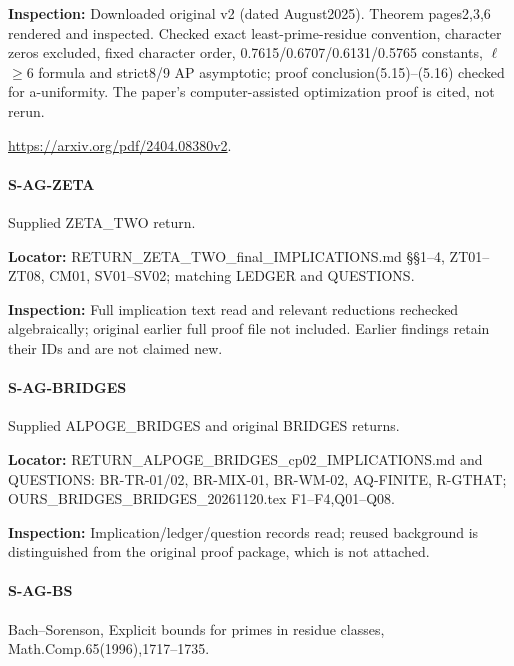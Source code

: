\documentclass[11pt,a4paper]{article}
\begin{document}
\textbf{Inspection:} Downloaded original v2 (dated August2025).\allowbreak{} Theorem pages2,3,6 rendered and inspected.\allowbreak{} Checked exact least-prime-residue convention, character zeros excluded, fixed character order, 0.\allowbreak{}7615/\allowbreak{}0.\allowbreak{}6707/\allowbreak{}0.\allowbreak{}6131/\allowbreak{}0.\allowbreak{}5765 constants, \ensuremath{\ell}\ensuremath{\ge}6 formula and strict8/\allowbreak{}9 AP asymptotic; proof conclusion(5.\allowbreak{}15)–\allowbreak{}(5.\allowbreak{}16) checked for a-uniformity.\allowbreak{} The paper’s computer-assisted optimization proof is cited, not rerun.\allowbreak{}

\url{https://arxiv.org/pdf/2404.08380v2}.

\paragraph{S-AG-ZETA} Supplied ZETA\_\allowbreak{}TWO return.

\textbf{Locator:} RETURN\_\allowbreak{}ZETA\_\allowbreak{}TWO\_\allowbreak{}final\_\allowbreak{}IMPLICATIONS.\allowbreak{}md §§1–\allowbreak{}4, ZT01–\allowbreak{}ZT08, CM01, SV01–\allowbreak{}SV02; matching LEDGER and QUESTIONS.

\textbf{Inspection:} Full implication text read and relevant reductions rechecked algebraically; original earlier full proof file not included.\allowbreak{} Earlier findings retain their IDs and are not claimed new.\allowbreak{}


\paragraph{S-AG-BRIDGES} Supplied ALPOGE\_\allowbreak{}BRIDGES and original BRIDGES returns.

\textbf{Locator:} RETURN\_\allowbreak{}ALPOGE\_\allowbreak{}BRIDGES\_\allowbreak{}cp02\_\allowbreak{}IMPLICATIONS.\allowbreak{}md and QUESTIONS:\allowbreak{} BR-TR-01/\allowbreak{}02, BR-MIX-01, BR-WM-02, AQ-FINITE, R-GTHAT; OURS\_\allowbreak{}BRIDGES\_\allowbreak{}BRIDGES\_\allowbreak{}20261120.\allowbreak{}tex F1–\allowbreak{}F4,Q01–\allowbreak{}Q08.

\textbf{Inspection:} Implication/\allowbreak{}ledger/\allowbreak{}question records read; reused background is distinguished from the original proof package, which is not attached.\allowbreak{}


\paragraph{S-AG-BS} Bach–\allowbreak{}Sorenson, Explicit bounds for primes in residue classes, Math.\allowbreak{}Comp.\allowbreak{}65(1996),1717–\allowbreak{}1735.
\end{document}
